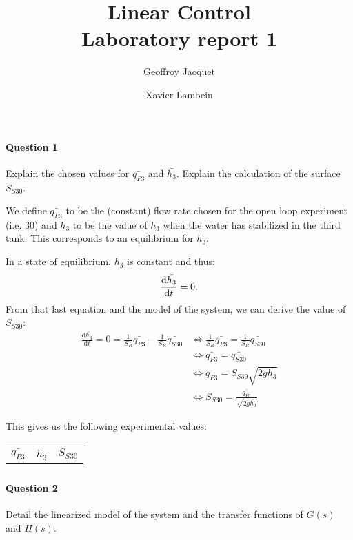 \documentclass[a4paper,11pt]{article}
\author{Geoffroy Jacquet \and Xavier Lambein}
\title{Linear Control\\Laboratory report 1}
\newcommand{\equil}[1]{\bar{#1}}
\renewcommand{\d}{\mathrm{d}}
\begin{document}
\maketitle

\paragraph{Question 1} Explain the chosen values for $\equil{q_{P3}}$ and $\equil{h_3}$. Explain the calculation of the surface $S_{S30}$.

We define $\equil{q_{P3}}$ to be the (constant) flow rate chosen for the open loop experiment (i.e. 30\milli\liter\per\second) and $\equil{h_3}$ to be the value of $h_3$ when the water has stabilized in the third tank. This corresponds to an equilibrium for $h_3$.

In a state of equilibrium, $h_3$ is constant and thus:
\[
    \frac{\d\equil{h_3}}{\d{t}} = 0
    \text.
\]
From that last equation and the model of the system, we can derive the value of $S_{S30}$:
\begin{align*}
    \frac{\d\equil{h_3}}{\d{t}} = 0 = \frac{1}{S_R} \equil{q_{P3}} - \frac{1}{S_R} \equil{q_{S30}}
    &\Leftrightarrow \frac{1}{S_R} \equil{q_{P3}} = \frac{1}{S_R} \equil{q_{S30}} \\
    &\Leftrightarrow \equil{q_{P3}} = \equil{q_{S30}} \\
    &\Leftrightarrow \equil{q_{P3}} = S_{S30} \sqrt{2g\equil{h_3}} \\
    &\Leftrightarrow S_{S30} = \frac{\equil{q_{P3}}}{\sqrt{2g\equil{h_3}}}
\end{align*}

This gives us the following experimental values:
\begin{center}
\begin{tabular}{ccc}
    $\equil{q_{P3}}$ & $\equil{h_3}$ & $S_{S30}$ \\
    \hline
    & &
\end{tabular}
\end{center}

\paragraph{Question 2} Detail the linearized model of the system and the transfer functions of $G(s)$ and $H(s)$.
\end{document}

